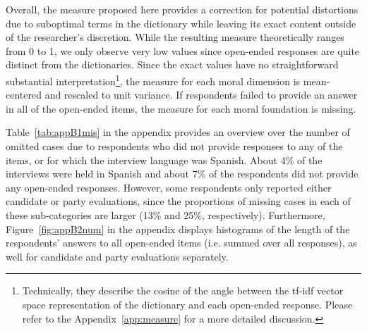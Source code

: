 \documentclass[12pt]{article}
\begin{document}
Overall, the measure proposed here provides a correction for potential distortions due to suboptimal terms in the dictionary while leaving its exact content outside of the researcher's discretion. While the resulting measure theoretically ranges from 0 to 1, we only observe very low values since open-ended responses are quite distinct from the dictionaries. Since the exact values have no straightforward substantial interpretation\footnote{Technically, they describe the cosine of the angle between the tf-idf vector space representation of the dictionary and each open-ended response. Please refer to the Appendix~\ref{app:measure} for a more detailed discussion.}, the measure for each moral dimension is mean-centered and rescaled to unit variance. If respondents failed to provide an answer in all of the open-ended items, the measure for each moral foundation is missing.

Table~\ref{tab:appB1mis} in the appendix provides an overview over the number of omitted cases due to respondents who did not provide responses to any of the items, or for which the interview language was Spanish. About 4\% of the interviews were held in Spanish and about 7\% of the respondents did not provide any open-ended responses. However, some respondents only reported either candidate or party evaluations, since the proportions of missing cases in each of these sub-categories are larger (13\% and 25\%, respectively). Furthermore, Figure~\ref{fig:appB2num} in the appendix displays histograms of the length of the respondents' answers to all open-ended items (i.e. summed over all responses), as well for candidate and party evaluations separately.
\end{document}
